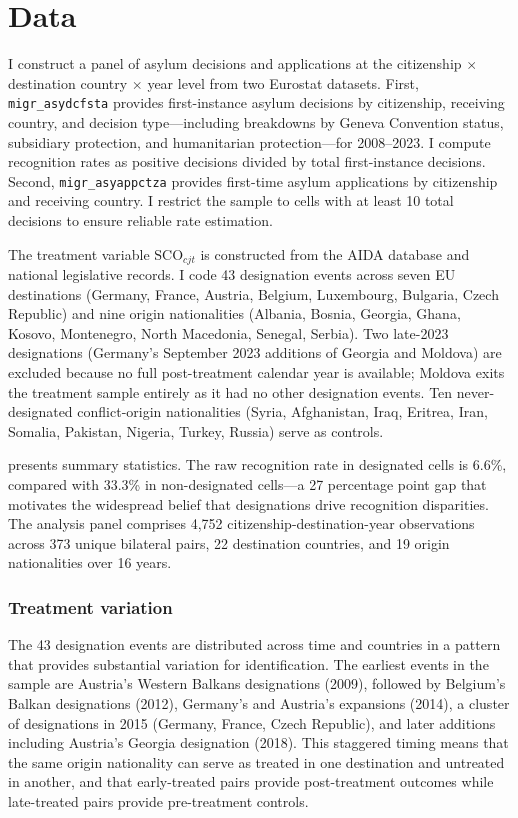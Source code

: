 \documentclass[12pt]{article}
\begin{document}
\section{Data}

I construct a panel of asylum decisions and applications at the citizenship $\times$ destination country $\times$ year level from two Eurostat datasets. First, \texttt{migr\_asydcfsta} provides first-instance asylum decisions by citizenship, receiving country, and decision type---including breakdowns by Geneva Convention status, subsidiary protection, and humanitarian protection---for 2008--2023. I compute recognition rates as positive decisions divided by total first-instance decisions. Second, \texttt{migr\_asyappctza} provides first-time asylum applications by citizenship and receiving country. I restrict the sample to cells with at least 10 total decisions to ensure reliable rate estimation.

The treatment variable $\text{SCO}_{cjt}$ is constructed from the AIDA database \citep{aida2023country} and national legislative records. I code 43 designation events across seven EU destinations (Germany, France, Austria, Belgium, Luxembourg, Bulgaria, Czech Republic) and nine origin nationalities (Albania, Bosnia, Georgia, Ghana, Kosovo, Montenegro, North Macedonia, Senegal, Serbia). Two late-2023 designations (Germany's September 2023 additions of Georgia and Moldova) are excluded because no full post-treatment calendar year is available; Moldova exits the treatment sample entirely as it had no other designation events. Ten never-designated conflict-origin nationalities (Syria, Afghanistan, Iraq, Eritrea, Iran, Somalia, Pakistan, Nigeria, Turkey, Russia) serve as controls.

 presents summary statistics. The raw recognition rate in designated cells is 6.6\%, compared with 33.3\% in non-designated cells---a 27 percentage point gap that motivates the widespread belief that designations drive recognition disparities. The analysis panel comprises 4,752 citizenship-destination-year observations across 373 unique bilateral pairs, 22 destination countries, and 19 origin nationalities over 16 years.

\subsubsection*{Treatment variation} The 43 designation events are distributed across time and countries in a pattern that provides substantial variation for identification. The earliest events in the sample are Austria's Western Balkans designations (2009), followed by Belgium's Balkan designations (2012), Germany's and Austria's expansions (2014), a cluster of designations in 2015 (Germany, France, Czech Republic), and later additions including Austria's Georgia designation (2018). This staggered timing means that the same origin nationality can serve as treated in one destination and untreated in another, and that early-treated pairs provide post-treatment outcomes while late-treated pairs provide pre-treatment controls.
\end{document}
